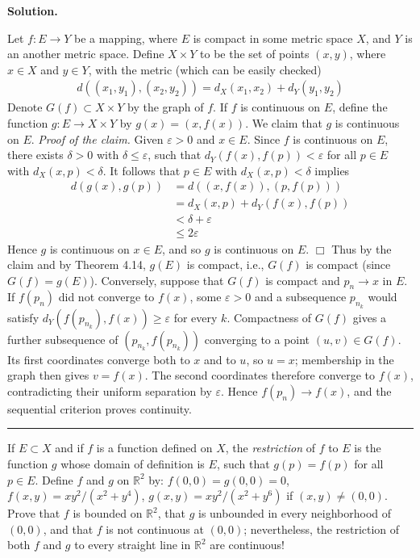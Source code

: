 \documentclass[12pt]{article}
\theoremstyle{definition}
\begin{document}
\smallskip
\noindent\textbf{Solution.}\quad

Let $f:E\to Y$ be a mapping, where $E$ is compact in some metric space $X$, and $Y$ is an another metric space. Define $X\times Y$ to be the set of points $(x,y)$, where $x\in X$ and $y\in Y$, with the metric (which can be easily checked)
\begin{align*}
d((x_1,y_1),(x_2,y_2))=d_X(x_1,x_2)+d_Y(y_1,y_2)
\end{align*}
Denote $G(f)\subset X\times Y$ by the graph of $f$. If $f$ is continuous on $E$, define the function $g:E\to X\times Y$ by $g(x)=(x,f(x))$. We claim that $g$ is continuous on $E$.
\textit{Proof of the claim.} Given $\varepsilon>0$ and $x\in E$. Since $f$ is continuous on $E$, there exists $\delta>0$ with $\delta\le\varepsilon$, such that $d_Y(f(x),f(p))<\varepsilon$ for all $p\in E$ with $d_X(x,p)<\delta$. It follows that $p\in E$ with $d_X(x,p)<\delta$ implies
\begin{align*}
d(g(x),g(p))
&=d((x,f(x)),(p,f(p))) \\
&=d_X(x,p)+d_Y(f(x),f(p)) \\
&<\delta+\varepsilon \\
&\le 2\varepsilon
\end{align*}
Hence $g$ is continuous on $x\in E$, and so $g$ is continuous on $E$. $\Box$
Thus by the claim and by Theorem 4.14, $g(E)$ is compact, i.e., $G(f)$ is compact (since $G(f)=g(E)$). Conversely, suppose that $G(f)$ is compact and $p_n\to x$ in $E$.  If $f(p_n)$ did not converge to $f(x)$, some $\varepsilon>0$ and a subsequence $p_{n_k}$ would satisfy $d_Y(f(p_{n_k}),f(x))\ge\varepsilon$ for every $k$.  Compactness of $G(f)$ gives a further subsequence of $(p_{n_k},f(p_{n_k}))$ converging to a point $(u,v)\in G(f)$.  Its first coordinates converge both to $x$ and to $u$, so $u=x$; membership in the graph then gives $v=f(x)$.  The second coordinates therefore converge to $f(x)$, contradicting their uniform separation by $\varepsilon$.  Hence $f(p_n)\to f(x)$, and the sequential criterion proves continuity.



\bigskip\noindent\hrule\bigskip

If $E\subset X$ and if $f$ is a function defined on $X$, the \textit{restriction} of $f$ to $E$ is the function $g$ whose domain of definition is $E$, such that $g(p)=f(p)$ for all $p\in E$. Define $f$ and $g$ on $\mathbb{R}^2$ by: $f(0,0)=g(0,0)=0$, $f(x,y)=xy^2/(x^2+y^4)$, $g(x,y)=xy^2/(x^2+y^6)$ if $(x,y)\ne(0,0)$. Prove that $f$ is bounded on $\mathbb{R}^2$, that $g$ is unbounded in every neighborhood of $(0,0)$, and that $f$ is not continuous at $(0,0)$; nevertheless, the restriction of both $f$ and $g$ to every straight line in $\mathbb{R}^2$ are continuous!
\end{document}

